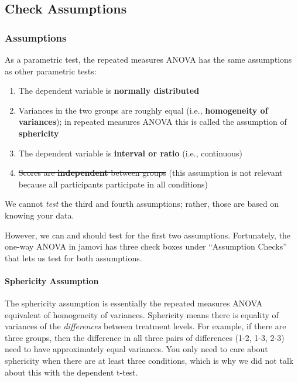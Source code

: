 \documentclass[
]{book}
\begin{document}
\hypertarget{check-assumptions-5}{%
\subsection{Check Assumptions}\label{check-assumptions-5}}

\hypertarget{assumptions-4}{%
\subsubsection{Assumptions}\label{assumptions-4}}

As a parametric test, the repeated measures ANOVA has the same assumptions as other parametric tests:

\begin{enumerate}
\def\labelenumi{\arabic{enumi}.}
\item
  The dependent variable is \textbf{normally distributed}
\item
  Variances in the two groups are roughly equal (i.e., \textbf{homogeneity of variances}); in repeated measures ANOVA this is called the assumption of \textbf{sphericity}
\item
  The dependent variable is \textbf{interval or ratio} (i.e., continuous)
\item
  \sout{Scores are \textbf{independent} between groups} (this assumption is not relevant because all participants participate in all conditions)
\end{enumerate}

We cannot \emph{test} the third and fourth assumptions; rather, those are based on knowing your data.

However, we can and should test for the first two assumptions. Fortunately, the one-way ANOVA in jamovi has three check boxes under ``Assumption Checks'' that lets us test for both assumptions.

\hypertarget{sphericity-assumption}{%
\paragraph{Sphericity Assumption}\label{sphericity-assumption}}

The sphericity assumption is essentially the repeated measures ANOVA equivalent of homogeneity of variances. Sphericity means there is equality of variances of the \emph{differences} between treatment levels. For example, if there are three groups, then the difference in all three pairs of differences (1-2, 1-3, 2-3) need to have approximately equal variances. You only need to care about sphericity when there are at least three conditions, which is why we did not talk about this with the dependent t-test.
\end{document}
